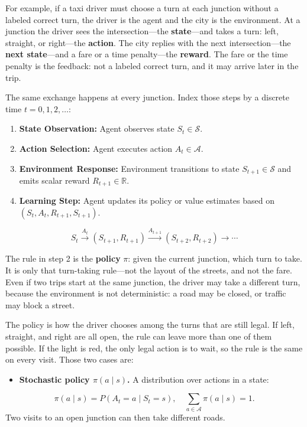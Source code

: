 For example, if a taxi driver must choose a turn at each junction without a labeled correct turn, the driver is the agent and the city is the environment. At a junction the driver sees the intersection---the \textbf{state}---and takes a turn: left, straight, or right---the \textbf{action}. The city replies with the next intersection---the \textbf{next state}---and a fare or a time penalty---the \textbf{reward}. The fare or the time penalty is the feedback: not a labeled correct turn, and it may arrive later in the trip.

The same exchange happens at every junction. Index those steps by a discrete time $t = 0, 1, 2, \dots$:

\begin{enumerate}
\item \textbf{State Observation:} Agent observes state $S_t \in \mathcal{S}$.
\item \textbf{Action Selection:} Agent executes action $A_t \in \mathcal{A}$.
\item \textbf{Environment Response:} Environment transitions to state $S_{t+1} \in \mathcal{S}$ and emits scalar reward $R_{t+1} \in \mathbb{R}$.
\item \textbf{Learning Step:} Agent updates its policy or value estimates based on $(S_t, A_t, R_{t+1}, S_{t+1})$.
\end{enumerate}
\[
S_t \xrightarrow{A_t} (S_{t+1}, R_{t+1}) \xrightarrow{A_{t+1}} (S_{t+2}, R_{t+2}) \rightarrow \cdots
\]

The rule in step 2 is the \textbf{policy} $\pi$: given the current junction, which turn to take. It is only that turn-taking rule---not the layout of the streets, and not the fare. Even if two trips start at the same junction, the driver may take a different turn, because the environment is not deterministic: a road may be closed, or traffic may block a street.

The policy is how the driver chooses among the turns that are still legal. If left, straight, and right are all open, the rule can leave more than one of them possible. If the light is red, the only legal action is to wait, so the rule is the same on every visit. Those two cases are:

\begin{itemize}
\item \textbf{Stochastic policy $\pi(a \mid s)$.} A distribution over actions in a state:
\end{itemize}
\[
\pi(a \mid s) = P(A_t = a \mid S_t = s), \quad \sum_{a \in \mathcal{A}} \pi(a \mid s) = 1.
\] Two visits to an open junction can then take different roads.

